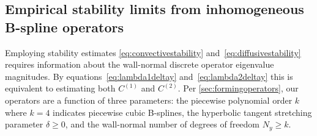 \documentclass[letterpaper,11pt,nointlimits,reqno,draft]{amsbook}
\begin{document}
\subsection{Empirical stability limits from inhomogeneous B-spline operators}
\label{sec:wallnormaleigval}

Employing stability estimates \eqref{eq:convectivestability}
and~\eqref{eq:diffusivestability} requires information about the wall-normal
discrete operator eigenvalue magnitudes.  By equations~\eqref{eq:lambda1deltay}
and~\eqref{eq:lambda2deltay} this is equivalent to estimating both $C^{(1)}$
and $C^{(2)}$.  Per \autoref{sec:formingoperators}, our operators are a
function of three parameters: the piecewise polynomial order $k$ where $k=4$
indicates piecewise cubic B-splines, the hyperbolic tangent stretching
parameter $\delta\geq{}0$, and the wall-normal number of degrees of freedom
$N_y\geq{}k$.
\end{document}
